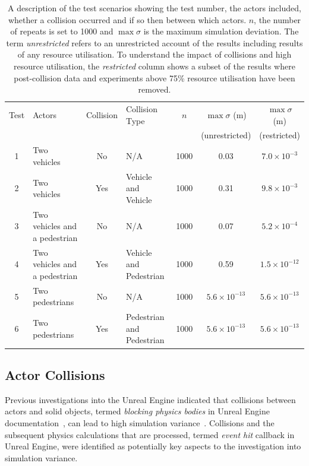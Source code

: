 \begin{table}[t]
\centering
\begin{tabular}{clclccc}
\toprule
Test & Actors               & Collision    & Collision Type        & $n$  & $\max\sigma$ (m) & $\max\sigma$ (m) \\ 
   &                  &        &               &      & (unrestricted)  & (restricted)  \\ \midrule
1    & Two vehicles                   & No       & N/A               & 1000 & 0.03 & $7.0{\times}10^{-3}$ \\
2    & Two vehicles                   & Yes      & Vehicle and Vehicle     & 1000 & 0.31 & $9.8{\times}10^{-3}$ \\
3    & Two vehicles and a pedestrian  & No       & N/A               & 1000 & 0.07 & $5.2{\times}10^{-4}$ \\
4    & Two vehicles and a pedestrian  & Yes      & Vehicle and Pedestrian    & 1000 & 0.59 & $1.5{\times}10^{-12}$ \\
5    & Two pedestrians                & No       & N/A               & 1000 & $5.6{\times}10^{-13}$ & $5.6{\times}10^{-13}$ \\
6    & Two pedestrians                & Yes      & Pedestrian and Pedestrian & 1000 & $5.6{\times}10^{-13}$ & $5.6{\times}10^{-13}$ \\
\bottomrule
\end{tabular}
\caption{A description of the test scenarios showing the test number, the actors included, whether a collision occurred and if so then between which actors. $n$, the number of repeats is set to 1000 and $\max\sigma$ is the maximum simulation deviation. The term \textit{unrestricted} refers to an unrestricted account of the results including results of any resource utilisation. To understand the impact of collisions and high resource utilisation, the \textit{restricted} column shows a subset of the results where post-collision data and experiments above 75\% resource utilisation have been removed.}
\label{TableOfExperiments}
\end{table}

\subsection{Actor Collisions}\label{S:Actor_Collisions}
Previous investigations into the Unreal Engine indicated that collisions between actors and solid objects, termed \textit{blocking physics bodies} in Unreal Engine documentation~\cite{collision_overview}, can lead to high simulation variance~\cite{TSLUnrealEngineTesting}. 
%
Collisions and the subsequent physics calculations that are processed, termed \textit{event hit} callback in Unreal Engine, were identified as potentially key aspects to the investigation into simulation variance.

